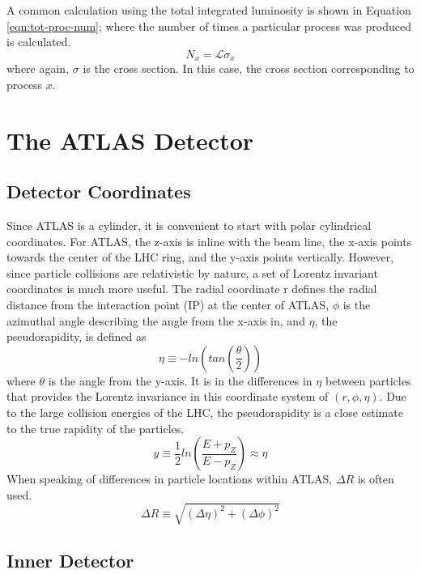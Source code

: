 		A common calculation using the total integrated luminosity is shown in Equation \ref{eqn:tot-proc-num}; where the number of times a particular process was produced is calculated.
		\begin{equation}\label{eqn:tot-proc-num}
		N_{x} = \mathcal{L} \sigma_{x}
		\end{equation}
		where again, $\sigma$ is the cross section. In this case, the cross section corresponding to process $x$.


\section{The ATLAS Detector}

	\subsection{Detector Coordinates}
	Since ATLAS is a cylinder, it is convenient to start with polar cylindrical coordinates. For ATLAS, the z-axis is inline with the beam line, the x-axis points towards the center of the LHC ring, and the y-axis points vertically. However, since particle collisions are relativistic by nature, a set of Lorentz invariant coordinates is much more useful. The radial coordinate r defines the radial distance from the interaction point (IP) at the center of ATLAS, $\phi$ is the azimuthal angle describing the angle from the x-axis in, and $\eta$, the pseudorapidity, is defined as 
	\begin{equation}\label{eqn:eta}
	\eta \equiv - ln(tan(\frac{\theta}{2}))
	\end{equation}
	where $\theta$ is the angle from the y-axis. It is in the differences in $\eta$ between particles that provides the Lorentz invariance in this coordinate system of $(r,\phi,\eta)$. Due to the large collision energies of the LHC, the pseudorapidity is a close estimate to the true rapidity of the particles. 
	\begin{equation}\label{eqn:rapidity}
	y \equiv \frac{1}{2} ln(\frac{E+p_Z}{E-p_Z}) \approx \eta
	\end{equation}
	When speaking of differences in particle locations within ATLAS, $\Delta R$  is often used.
	\begin{equation}\label{eqn:dR}
	\Delta R \equiv \sqrt{ (\Delta \eta)^2 + (\Delta \phi)^2}
	\end{equation}

	\subsection{Inner Detector}

